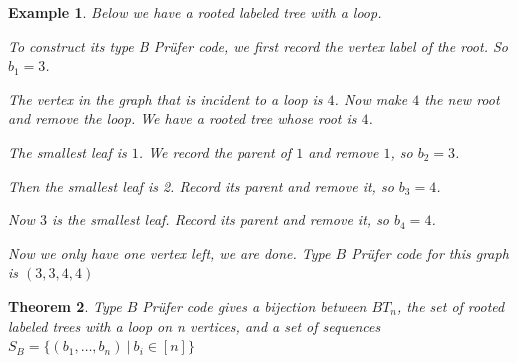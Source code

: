\documentclass[11pt]{amsart}
\newtheorem{thm}{Theorem}[section]
\newtheorem{exa}[thm]{Example}%
\begin{document}
\begin{exa}
    Below we have a rooted labeled tree with a loop.

\begin{center}
\end{center}

To construct its type B Pr\"{u}fer code, we first record the vertex label of the root. So $b_1=3$.

The vertex in the graph that is incident to a loop is $4$. Now make $4$ the new root and remove the loop. We have a rooted tree whose root is $4$.

The smallest leaf is $1$. We record the parent of $1$ and remove $1$, so $b_2=3$.

Then the smallest leaf is 2. Record its parent and remove it, so $b_3=4$.

Now $3$ is the smallest leaf. Record its parent and remove it, so $b_4=4$.

Now we only have one vertex left, we are done. Type $B$ Pr\"{u}fer code for this graph is $(3,3,4,4)$
\end{exa}

\begin{thm}\label{thm F}
    Type $B$ Pr\"{u}fer code gives a bijection between $BT_n$, the set of rooted labeled trees with a loop on n vertices, and a set of sequences $S_B=\{(b_1,\dots,b_n) \ | \ b_i \in [n]\}$
\end{thm}
\end{document}
